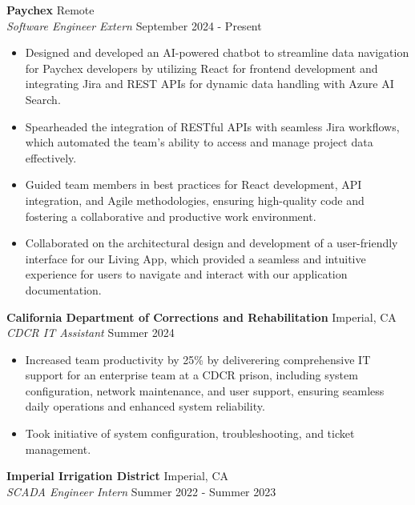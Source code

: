 \documentclass[a4paper]{article}
\begin{document}
\textbf{Paychex} \hfill Remote\\
\textit{Software Engineer Extern} \hfill September 2024 - Present\\
\vspace{-1mm}
\begin{itemize} \itemsep 1pt
	\item Designed and developed an AI-powered chatbot to streamline data navigation for Paychex developers by utilizing React for frontend development and integrating Jira and REST APIs for dynamic data handling with Azure AI Search.
	\item Spearheaded the integration of RESTful APIs with seamless Jira workflows, which automated the team’s ability to access and manage project data effectively.
	\item Guided team members in best practices for React development, API integration, and Agile methodologies, ensuring high-quality code and fostering a collaborative and productive work environment.
	\item Collaborated on the architectural design and development of a user-friendly interface for our Living App, which provided a seamless and intuitive experience for users to navigate and interact with our application documentation.
\end{itemize}
\textbf{California Department of Corrections and Rehabilitation} \hfill Imperial, CA\\
\textit{CDCR IT Assistant} \hfill Summer 2024\\
\vspace{-1mm}
\begin{itemize} \itemsep 1pt
	\item Increased team productivity by 25\% by deliverering comprehensive IT support for an enterprise team at a CDCR prison, including system configuration, network maintenance, and user support, ensuring seamless daily operations and enhanced system reliability.
	\item Took initiative of system configuration, troubleshooting, and ticket management.
\end{itemize}
\textbf{Imperial Irrigation District} \hfill Imperial, CA\\
\textit{SCADA Engineer Intern} \hfill Summer 2022 - Summer 2023\\
\vspace{-1mm}
\end{document}

